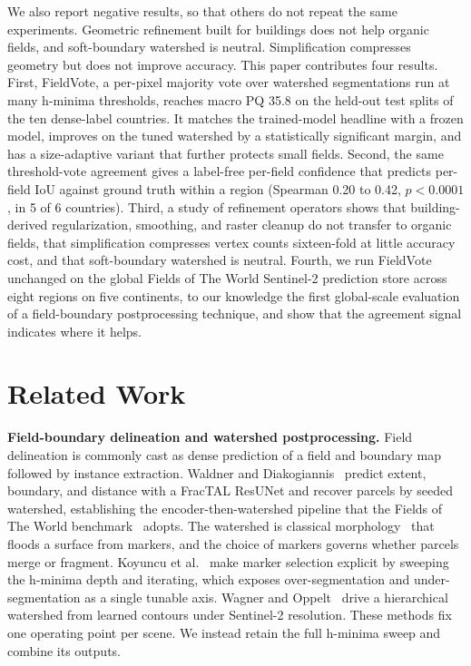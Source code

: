 \documentclass[conference]{IEEEtran}
\newcommand{\parhead}[1]{\smallskip\noindent\textbf{#1}\hspace{0.6em}}
\begin{document}
We also report negative results, so that others do not repeat the same experiments. Geometric refinement built for buildings does not help organic fields, and soft-boundary watershed is neutral. Simplification compresses geometry but does not improve accuracy. This paper contributes four results. First, FieldVote, a per-pixel majority vote over watershed segmentations run at many h-minima thresholds, reaches macro PQ 35.8 on the held-out test splits of the ten dense-label countries. It matches the trained-model headline with a frozen model, improves on the tuned watershed by a statistically significant margin, and has a size-adaptive variant that further protects small fields. Second, the same threshold-vote agreement gives a label-free per-field confidence that predicts per-field IoU against ground truth within a region (Spearman 0.20 to 0.42, $p < 0.0001$, in 5 of 6 countries). Third, a study of refinement operators shows that building-derived regularization, smoothing, and raster cleanup do not transfer to organic fields, that simplification compresses vertex counts sixteen-fold at little accuracy cost, and that soft-boundary watershed is neutral. Fourth, we run FieldVote unchanged on the global Fields of The World Sentinel-2 prediction store across eight regions on five continents, to our knowledge the first global-scale evaluation of a field-boundary postprocessing technique, and show that the agreement signal indicates where it helps.

\section{Related Work}
\parhead{Field-boundary delineation and watershed postprocessing.}
Field delineation is commonly cast as dense prediction of a field and boundary map followed by instance extraction. Waldner and Diakogiannis~\cite{waldner2020decode} predict extent, boundary, and distance with a FracTAL ResUNet and recover parcels by seeded watershed, establishing the encoder-then-watershed pipeline that the Fields of The World benchmark~\cite{kerner2024ftw} adopts. The watershed is classical morphology~\cite{soille2004morphological} that floods a surface from markers, and the choice of markers governs whether parcels merge or fragment. Koyuncu et al.~\cite{koyuncu2016iterative} make marker selection explicit by sweeping the h-minima depth and iterating, which exposes over-segmentation and under-segmentation as a single tunable axis. Wagner and Oppelt~\cite{wagner2020growing} drive a hierarchical watershed from learned contours under Sentinel-2 resolution. These methods fix one operating point per scene. We instead retain the full h-minima sweep and combine its outputs.
\end{document}
